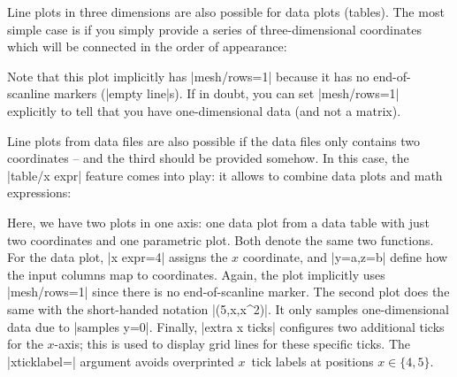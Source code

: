 {Line plots in three dimensions are also possible for data plots (tables). The
most simple case is if you simply provide a series of three-dimensional
coordinates which will be connected in the order of appearance:
%
\begin{codeexample}[]
\end{codeexample}
%
\noindent Note that this plot implicitly has |mesh/rows=1| because it has no
end-of-scanline markers (|empty line|s). If in doubt, you can set |mesh/rows=1|
explicitly to tell \PGFPlots{} that you have one-dimensional data (and not a
matrix).

Line plots from data files are also possible if the data files only contains
two coordinates -- and the third should be provided somehow. In this case, the
|table/x expr| feature comes into play: it allows to combine data plots and
math expressions:
%
\begin{codeexample}[]
\end{codeexample}
%
\noindent Here, we have two plots in one axis: one data plot from a data table
with just two coordinates and one parametric plot. Both denote the same two
functions. For the data plot, |x expr=4| assigns the $x$ coordinate, and
|y=a,z=b| define how the input columns map to coordinates. Again, the plot
implicitly uses |mesh/rows=1| since there is no end-of-scanline marker. The
second plot does the same with the short-handed notation |(5,x,x^2)|. It only
samples one-dimensional data due to |samples y=0|. Finally, |extra x ticks|
configures two additional ticks for the $x$-axis; this is used to display grid
lines for these specific ticks. The |xticklabel=\empty| argument avoids
overprinted $x$~tick labels at positions $x\in\{4,5\}$.

}
